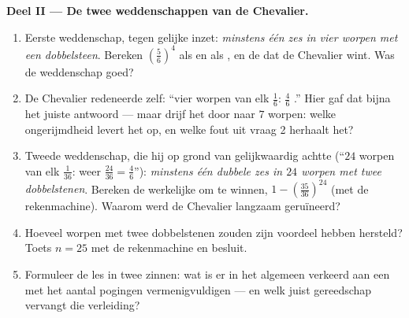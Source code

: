 \begin{problem}
\medskip
\noindent\textbf{Deel II --- De twee weddenschappen van de Chevalier.}
\begin{enumerate}[resume]
  \item Eerste weddenschap, tegen gelijke inzet: \emph{minstens één zes in vier
        worpen met een dobbelsteen}. Bereken $\left(\frac56\right)^4$ als  en
        als , en de  dat de Chevalier wint. Was de weddenschap
        goed?
  \item De Chevalier redeneerde zelf: ``vier worpen van elk $\frac16$: $\frac46$
        .'' Hier gaf dat bijna het juiste antwoord --- maar drijf het door naar
        $7$ worpen: welke ongerijmdheid levert het op, en welke fout uit vraag 2
        herhaalt het?
  \item Tweede weddenschap, die hij op grond van  gelijkwaardig achtte
        (``$24$ worpen van elk $\frac1{36}$: weer $\frac{24}{36} = \frac46$''):
        \emph{minstens één dubbele zes in $24$ worpen met twee dobbelstenen}.
        Bereken de werkelijke  om te winnen,
        $1 - \left(\frac{35}{36}\right)^{24}$ (met de rekenmachine). Waarom werd de
        Chevalier langzaam geruïneerd?
  \item Hoeveel worpen met twee dobbelstenen zouden zijn voordeel hebben
        hersteld? Toets $n = 25$ met de rekenmachine en besluit.
  \item Formuleer de les in twee zinnen: wat is er in het algemeen verkeerd aan een
         met het aantal pogingen vermenigvuldigen --- en welk juist gereedschap
        vervangt die verleiding?
\end{enumerate}


\end{problem}

